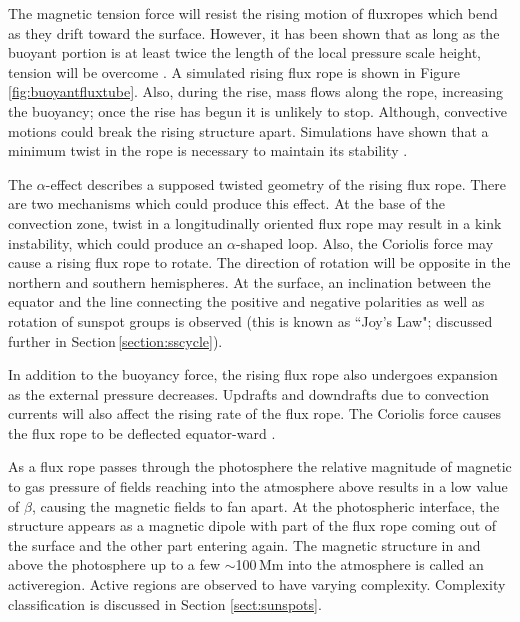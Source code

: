 The magnetic tension force will resist the rising motion of \glspl{fluxrope} which bend as they drift toward the surface. However, it has been shown that as long as the buoyant portion is at least twice the length of the local pressure scale height, tension will be overcome \citep{Parker:1955b}. A simulated rising flux rope is shown in Figure\,\ref{fig:buoyantfluxtube}. Also, during the rise, mass flows along the rope, increasing the buoyancy; once the rise has begun it is unlikely to stop. Although, convective motions could break the rising structure apart. Simulations have shown that a minimum twist in the rope is necessary to maintain its stability \citep[][and references therein]{Fan:2009}. 

The $\alpha$-effect describes a supposed twisted geometry of the rising flux rope. 
There are two mechanisms which could produce this effect. At the base of the convection zone, twist in a longitudinally oriented flux rope may result in a kink instability, which could produce an $\alpha$-shaped loop. 
Also, the Coriolis force may cause a rising flux rope to rotate. The direction of rotation will be opposite in the northern and southern hemispheres. At the surface, an inclination between the equator and the line connecting the positive and negative polarities as well as rotation of sunspot groups is observed (this is known as ``Joy's Law"; discussed further in Section\,\ref{section:sscycle}).

In addition to the buoyancy force, the rising flux rope also undergoes expansion as the external pressure decreases. Updrafts and downdrafts due to convection currents will also affect the rising rate of the flux rope. The Coriolis force causes the flux rope to be deflected equator-ward \citep{Choudhuri:1987}. %


As a flux rope passes through the photosphere the relative magnitude of magnetic to gas pressure of fields reaching into the atmosphere above results in a low value of $\beta$, causing the magnetic fields to fan apart. At the photospheric interface, the structure appears as a magnetic dipole with part of the flux rope coming out of the surface and the other part entering again. The magnetic structure in and above the photosphere up to a few $\sim$100\,Mm into the atmosphere is called an \gls{activeregion}. Active regions are observed to have varying complexity. Complexity classification is discussed in Section \ref{sect:sunspots}.

